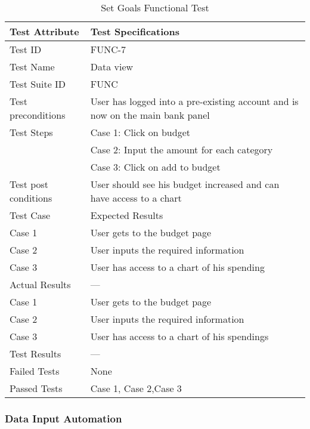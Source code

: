 \documentclass{article}
\begin{document}
\begin{table}[htbp]
\begin{center}
\begin{tabular}{|l | l|}
\hline
Test Attribute & Test Specifications \\
\hline
Test ID & FUNC-7 \\
\hline
Test Name  & Data view \\
\hline
Test Suite  ID & FUNC \\
\hline
Test preconditions & User has logged into a pre-existing account and is now on the main bank panel \\
\hline
Test Steps & Case 1: Click on budget\\
\hline
  & Case 2: Input the amount for each category \\
 \hline
  & Case 3: Click on add to budget \\
\hline
Test post conditions & User should see his budget increased and can have access to a chart \\
\hline
Test Case & Expected Results\\
\hline
Case 1  &  User gets to the budget page\\
\hline
Case 2 &  User inputs the required information  \\
\hline
Case 3 &  User has access to a chart of his spending  \\
\hline
Actual Results & ---\\
\hline
Case 1  &  User gets to the budget page\\
\hline
Case 2 &  User inputs the required information  \\
\hline
Case 3 &  User has access to a chart of his spendings  \\
\hline
Test Results & ---\\
\hline
Failed Tests & None\\
\hline
Passed Tests & Case 1, Case 2,Case 3\\
\hline
\end{tabular}
\end{center}
\caption{Set Goals Functional Test}
\end{table}
\label{table:2g}

\clearpage

\subsubsection{Data Input Automation}
\end{document}
